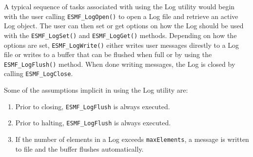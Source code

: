 

A typical sequence of tasks associated with using the Log utility would begin
with the user calling {\tt ESMF\_LogOpen()} to open a Log file and retrieve
an active Log object.  The user can then set or get options on how the Log
should be used with the {\tt ESMF\_LogSet()} and {\tt ESMF\_LogGet()} methods.
Depending on how the options are set, {\tt ESMF\_LogWrite()} either writes
user messages direstly to a Log file or writes to a buffer that can be flushed
when full or by using the {\tt ESMF\_LogFlush()} method.  When done writing
messages, the Log is closed by calling {\tt ESMF\_LogClose}.  

Some of the assumptions implicit in using the Log utility are:

\begin{enumerate}

\item Prior to closing, {\tt ESMF\_LogFlush} is always executed.
\item Prior to halting, {\tt ESMF\_LogFlush} is always executed.
\item If the number of elements in a Log exceeds {\tt maxElements}, 
a message is written to file and the buffer flushes automatically.

\end{enumerate}
